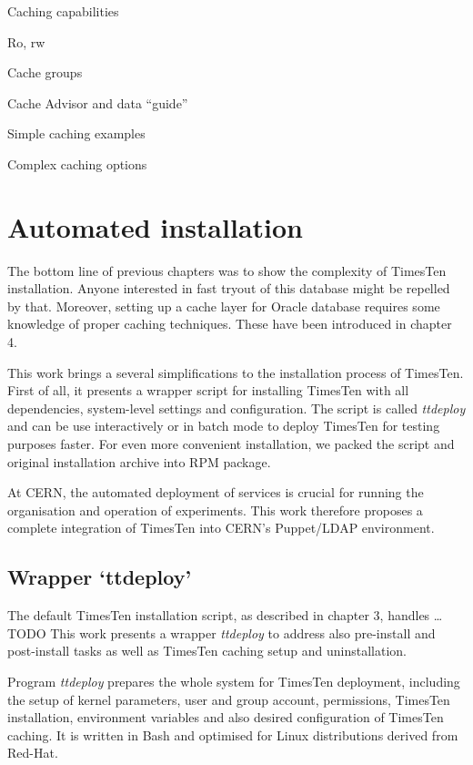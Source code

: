 \documentclass[11pt, letterpaper]{article}
\begin{document}
Caching capabilities

                Ro, rw

Cache groups

Cache Advisor and data “guide”

Simple caching examples

Complex caching options


\section{Automated installation}

The bottom line of previous chapters was to show the complexity of TimesTen installation. Anyone interested in fast tryout of this database might be repelled by that. Moreover, setting up a cache layer for Oracle database requires some knowledge of proper caching techniques. These have been introduced in chapter 4.

This work brings a several simplifications to the installation process of TimesTen. First of all, it presents a wrapper script for installing TimesTen with all dependencies, system-level settings and configuration. The script is called \emph{ttdeploy} and can be use interactively or in batch mode to deploy TimesTen for testing purposes faster. For even more convenient installation, we packed the script and original installation archive into RPM package.

At CERN, the automated deployment of services is crucial for running the organisation and operation of experiments.  This work therefore proposes a complete integration of TimesTen into CERN’s Puppet/LDAP environment.

\subsection{Wrapper ‘ttdeploy’}

The default TimesTen installation script, as described in chapter 3, handles … TODO This work presents a wrapper \emph{ttdeploy} to address also pre-install and post-install tasks as well as TimesTen caching setup and uninstallation.

Program \emph{ttdeploy} prepares the whole system for TimesTen deployment, including the setup of kernel parameters, user and group account, permissions, TimesTen installation, environment variables and also desired configuration of TimesTen caching. It is written in Bash and optimised for Linux distributions derived from Red-Hat.
\end{document}
